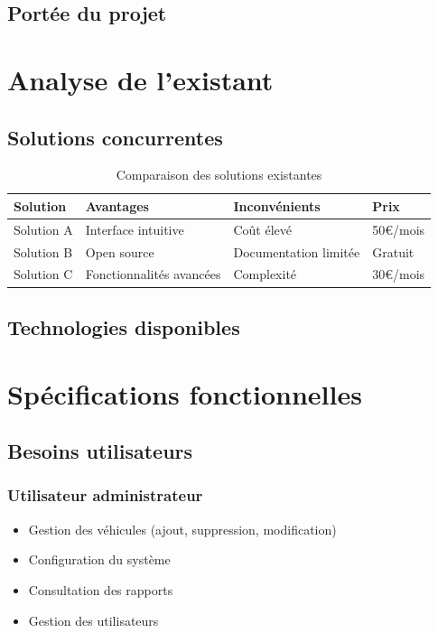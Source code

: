 \documentclass[12pt,a4paper]{article}
\begin{document}
\subsection{Portée du projet}

\lipsum[3]

\section{Analyse de l'existant}

\subsection{Solutions concurrentes}

\lipsum[4]

\begin{table}[h]
\centering
\begin{tabularx}{\textwidth}{|X|X|X|X|}
\hline
\textbf{Solution} & \textbf{Avantages} & \textbf{Inconvénients} & \textbf{Prix} \\
\hline
Solution A & Interface intuitive & Coût élevé & 50€/mois \\
\hline
Solution B & Open source & Documentation limitée & Gratuit \\
\hline
Solution C & Fonctionnalités avancées & Complexité & 30€/mois \\
\hline
\end{tabularx}
\caption{Comparaison des solutions existantes}
\end{table}

\subsection{Technologies disponibles}

\lipsum[5]

\section{Spécifications fonctionnelles}

\subsection{Besoins utilisateurs}

\subsubsection{Utilisateur administrateur}
\begin{itemize}
    \item Gestion des véhicules (ajout, suppression, modification)
    \item Configuration du système
    \item Consultation des rapports
    \item Gestion des utilisateurs
\end{itemize}
\end{document}
